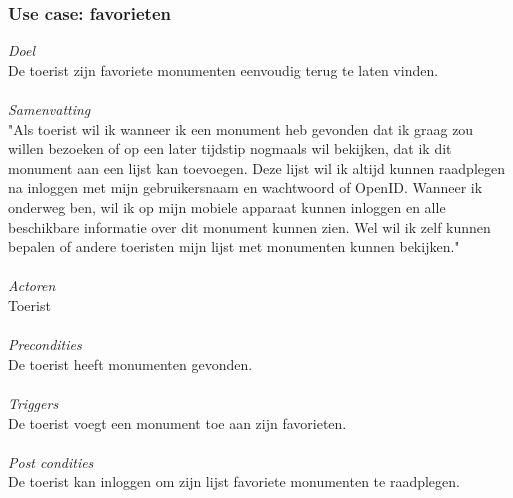 \documentclass[a4paper,10pt]{article}
\newcommand{\rsubsubsection}[1]{
\subsubsection{#1}\label{sec:sub:sub:#1}
}
\begin{document}
			\rsubsubsection{Use case: favorieten}
			\textit{Doel}\\
			De toerist zijn favoriete monumenten eenvoudig terug te laten vinden.\\ \\
			\textit{Samenvatting}\\
			"Als toerist wil ik wanneer ik een monument heb gevonden dat ik graag zou willen bezoeken of op een later tijdstip nogmaals wil bekijken, dat ik dit monument aan een lijst kan toevoegen. Deze lijst wil ik altijd kunnen raadplegen na inloggen met mijn gebruikersnaam en wachtwoord of OpenID. Wanneer ik onderweg ben, wil ik op mijn mobiele apparaat kunnen inloggen en alle beschikbare informatie over dit monument kunnen zien. Wel wil ik zelf kunnen bepalen of andere toeristen mijn lijst met monumenten kunnen bekijken."\\ \\
			\textit{Actoren}\\
			Toerist\\ \\
			\textit{Precondities}\\
			De toerist heeft monumenten gevonden.\\ \\
			\textit{Triggers}\\
			De toerist voegt een monument toe aan zijn favorieten.\\ \\
			\textit{Post condities}\\
			De toerist kan inloggen om zijn lijst favoriete monumenten te raadplegen.	
			
\end{document}
